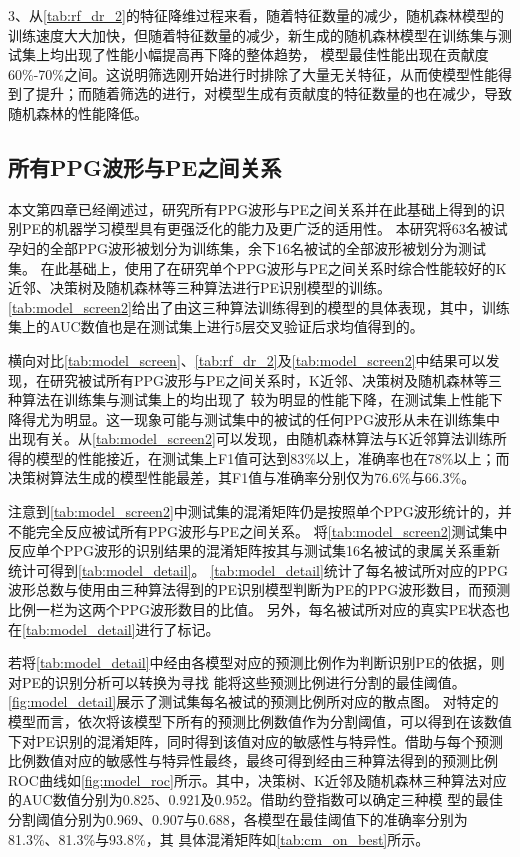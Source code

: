 3、从\autoref{tab:rf_dr_2}的特征降维过程来看，随着特征数量的减少，随机森林模型的训练速度大大加快，但随着特征数量的减少，新生成的随机森林模型在训练集与测试集上均出现了性能小幅提高再下降的整体趋势，
模型最佳性能出现在贡献度60\%-70\%之间。这说明筛选刚开始进行时排除了大量无关特征，从而使模型性能得到了提升；而随着筛选的进行，对模型生成有贡献度的特征数量的也在减少，导致随机森林的性能降低。

\subsection{所有PPG波形与PE之间关系}

本文第四章已经阐述过，研究所有PPG波形与PE之间关系并在此基础上得到的识别PE的机器学习模型具有更强泛化的能力及更广泛的适用性。
本研究将63名被试孕妇的全部PPG波形被划分为训练集，余下16名被试的全部波形被划分为测试集。
在此基础上，使用了在研究单个PPG波形与PE之间关系时综合性能较好的K近邻、决策树及随机森林等三种算法进行PE识别模型的训练。
\autoref{tab:model_screen2}给出了由这三种算法训练得到的模型的具体表现，其中，训练集上的AUC数值也是在测试集上进行5层交叉验证后求均值得到的。

横向对比\autoref{tab:model_screen}、\autoref{tab:rf_dr_2}及\autoref{tab:model_screen2}中结果可以发现，在研究被试所有PPG波形与PE之间关系时，K近邻、决策树及随机森林等三种算法在训练集与测试集上的均出现了
较为明显的性能下降，在测试集上性能下降得尤为明显。这一现象可能与测试集中的被试的任何PPG波形从未在训练集中出现有关。从\autoref{tab:model_screen2}可以发现，由随机森林算法与K近邻算法训练所得的模型的性能接近，在测试集上F1值可达到83\%以上，准确率也在78\%以上；而决策树算法生成的模型性能最差，其F1值与准确率分别仅为76.6\%与66.3\%。

注意到\autoref{tab:model_screen2}中测试集的混淆矩阵仍是按照单个PPG波形统计的，并不能完全反应被试所有PPG波形与PE之间关系。
将\autoref{tab:model_screen2}测试集中反应单个PPG波形的识别结果的混淆矩阵按其与测试集16名被试的隶属关系重新统计可得到\autoref{tab:model_detail}。
\autoref{tab:model_detail}统计了每名被试所对应的PPG波形总数与使用由三种算法得到的PE识别模型判断为PE的PPG波形数目，而预测比例一栏为这两个PPG波形数目的比值。
另外，每名被试所对应的真实PE状态也在\autoref{tab:model_detail}进行了标记。


若将\autoref{tab:model_detail}中经由各模型对应的预测比例作为判断识别PE的依据，则对PE的识别分析可以转换为寻找
能将这些预测比例进行分割的最佳阈值。\autoref{fig:model_detail}展示了测试集每名被试的预测比例所对应的散点图。
对特定的模型而言，依次将该模型下所有的预测比例数值作为分割阈值，可以得到在该数值下对PE识别的混淆矩阵，同时得到该值对应的敏感性与特异性。借助与每个预测比例数值对应的敏感性与特异性最终，最终可得到经由三种算法得到的预测比例
ROC曲线如\autoref{fig:model_roc}所示。其中，决策树、K近邻及随机森林三种算法对应的AUC数值分别为0.825、0.921及0.952。借助约登指数可以确定三种模
型的最佳分割阈值分别为0.969、0.907与0.688，各模型在最佳阈值下的准确率分别为81.3\%、81.3\%与93.8\%，其
具体混淆矩阵如\autoref{tab:cm_on_best}所示。

